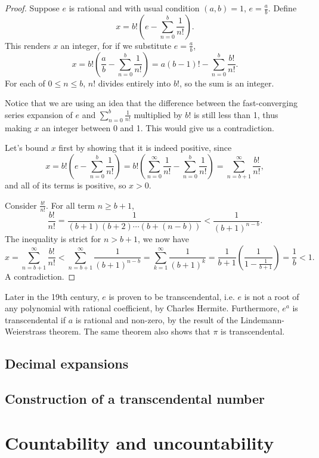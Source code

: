 \documentclass[main.tex]{subfiles}
\begin{document}
		\begin{proof}
			Suppose $e$ is rational and with usual condition $(a,b) = 1$, $e = \frac{a}{b}$. Define
			\begin{equation}
				x = b!\left(e - \sum_{n = 0}^{b} \frac{1}{n!}\right).
			\end{equation}
			This renders $x$ an integer, for if we substitute $e = \frac{a}{b}$,
			\begin{equation*}
				x = b!\left(\frac{a}{b} - \sum_{n = 0}^{b} \frac{1}{n!}\right) = a(b - 1)! - \sum_{n = 0}^{b} \frac{b!}{n!}.
			\end{equation*}
			For each of $0 \leq n \leq b$, $n!$ divides entirely into $b!$, so the sum is an integer.
			
			Notice that we are using an idea that the difference between the fast-converging series expansion of $e$ and $\sum_{n = 0}^{b} \frac{1}{n!}$ multiplied by $b!$ is still less than 1, thus making $x$ an integer between 0 and 1. This would give us a contradiction.
			
			Let's bound $x$ first by showing that it is indeed positive, since
			\begin{equation}
			x = b!\left(e - \sum_{n = 0}^{b} \frac{1}{n!}\right) = b!\left(\sum_{n = 0}^{\infty} \frac{1}{n!} - \sum_{n = 0}^{b} \frac{1}{n!}\right) = \sum_{n = b + 1}^{\infty} \frac{b!}{n!},
			\end{equation}
			and all of its terms is positive, so $x > 0$.
			
			Consider $\frac{b!}{n!}$. For all term $n \geq b + 1$,
			\begin{equation*}
				\frac{b!}{n!} = \frac{1}{(b + 1)(b + 2)\cdots(b + (n - b))} < \frac{1}{(b + 1)^{n - b}}.
			\end{equation*}
			The inequality is strict for $n > b + 1$, we now have
			\begin{equation}
				x = \sum_{n = b + 1}^{\infty} \frac{b!}{n!} < \sum_{n = b + 1}^{\infty} \frac{1}{(b + 1)^{n - b}} = \sum_{k = 1}^{\infty} \frac{1}{(b + 1)^{k}} = \frac{1}{b + 1}\left(\frac{1}{1 - \frac{1}{b + 1}}\right) = \frac{1}{b} < 1.
			\end{equation}
			A contradiction.
		\end{proof}
		Later in the 19th century, $e$ is proven to be transcendental, i.e. $e$ is not a root of any polynomial with rational coefficient, by Charles Hermite. Furthermore, $e^a$ is transcendental if $a$ is rational and non-zero, by the result of the Lindemann-Weierstrass theorem. The same theorem also shows that $\pi$ is transcendental.
		
		\subsection{Decimal expansions}
			
		\subsection{Construction of a transcendental number}
		
	\section{Countability and uncountability}
		
	
\end{document}
